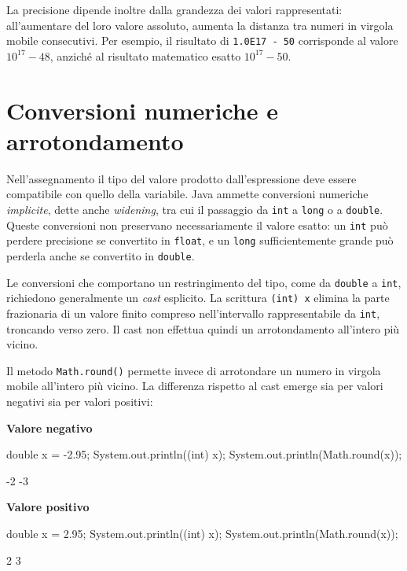 La precisione dipende inoltre dalla grandezza dei valori
rappresentati: all'aumentare del loro valore assoluto,
aumenta la distanza tra numeri in virgola mobile consecutivi.
Per esempio, il risultato di \texttt{1.0E17 - 50}
corrisponde al valore \(10^{17}-48\), anziché al
risultato matematico esatto \(10^{17}-50\).

\section{Conversioni numeriche e arrotondamento}
\label{sec:fi-java-conversioni}

Nell'assegnamento il tipo del valore prodotto dall'espressione
deve essere compatibile con quello della variabile. Java ammette
conversioni numeriche \emph{implicite}, dette anche
\emph{widening}, tra cui il passaggio da \texttt{int} a
\texttt{long} o a \texttt{double}. Queste conversioni non
preservano necessariamente il valore esatto: un \texttt{int}
può perdere precisione se convertito in \texttt{float},
e un \texttt{long} sufficientemente grande può perderla
anche se convertito in \texttt{double}.

Le conversioni che comportano un restringimento del tipo,
come da \texttt{double} a \texttt{int}, richiedono generalmente
un \emph{cast} esplicito. La scrittura \texttt{(int) x}
elimina la parte frazionaria di un valore finito compreso
nell'intervallo rappresentabile da \texttt{int}, troncando
verso zero. Il cast non effettua quindi un arrotondamento
all'intero più vicino.

Il metodo \texttt{Math.round()} permette invece di arrotondare
un numero in virgola mobile all'intero più vicino.
La differenza rispetto al cast emerge sia per valori
negativi sia per valori positivi:

\noindent
\begin{minipage}[t]{0.48\linewidth}
\vspace{0pt}
\textbf{Valore negativo}
\begin{unipdcode}[language=Java,
  basicstyle=\ttfamily\scriptsize,
  numbers=none,
  xleftmargin=0pt,
  xrightmargin=0pt,
  framexleftmargin=0.3em]
double x = -2.95;
System.out.println((int) x);
System.out.println(Math.round(x));
\end{unipdcode}
\begin{unipdterminal}
-2
-3
\end{unipdterminal}
\end{minipage}%
\hfill
\begin{minipage}[t]{0.48\linewidth}
\vspace{0pt}
\textbf{Valore positivo}
\begin{unipdcode}[language=Java,
  basicstyle=\ttfamily\scriptsize,
  numbers=none,
  xleftmargin=0pt,
  xrightmargin=0pt,
  framexleftmargin=0.3em]
double x = 2.95;
System.out.println((int) x);
System.out.println(Math.round(x));
\end{unipdcode}
\begin{unipdterminal}
2
3
\end{unipdterminal}
\end{minipage}

